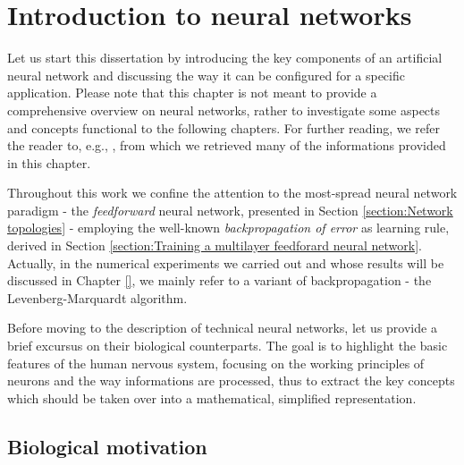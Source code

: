 \documentclass[12pt, a4paper, twoside, openright]{report}
\numberwithin{equation}{chapter}
\theoremstyle{theorem}
\theoremstyle{definition}
\theoremstyle{remark}
\theoremstyle{proposition}
\numberwithin{figure}{chapter}
\begin{document}
	\tableofcontents
	\listoffigures
	\listofalgorithms
	
	\chapter{Introduction to neural networks}
	\label{chapter:Introduction to neural networks}
	
		Let us start this dissertation by introducing the key components of an artificial neural network and discussing the way it can be configured for a specific application. Please note that this chapter is not meant to provide a comprehensive overview on neural networks, rather to investigate some aspects and concepts functional to the following chapters. For further reading, we refer the reader to, e.g., \cite{Hag14, Hay05, Kri}, from which we retrieved many of the informations provided in this chapter.
		
		Throughout this work we confine the attention to the most-spread neural network paradigm - the \emph{feedforward} neural network, presented in Section \ref{section:Network topologies} - employing the well-known \emph{backpropagation of error} as learning rule, derived in Section \ref{section:Training a multilayer feedforard neural network}. Actually, in the numerical experiments we carried out and whose results will be discussed in Chapter \ref{}, we mainly refer to a variant of backpropagation - the Levenberg-Marquardt algorithm.
		
		Before moving to the description of technical neural networks, let us provide a brief excursus on their biological counterparts. The goal is to highlight the basic features of the human nervous system, focusing on the working principles of neurons and the way informations are processed, thus to extract the key concepts which should be taken over into a mathematical, simplified representation.
		
	\vspace*{0.3cm} 
		
	\section{Biological motivation}
	\label{section:Biological motivation} 
	
\end{document}
